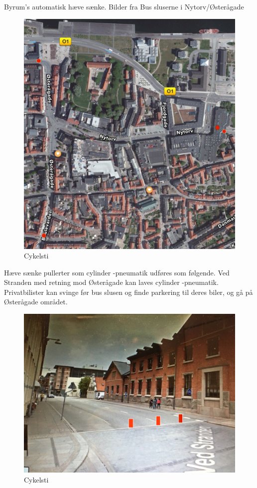           Byrum’s automatisk hæve sænke. Bilder fra %
Bus sluserne i Nytorv/Østerågade
\begin{figure}[htbp]
  \centering
  \begin{adjustbox}{max width=\textwidth}
    \includegraphics{figures/Billederogfigur/2.jpg}
 \end{adjustbox}
  \caption{Cykelsti}
   \label{fig:cykelsti}
\end{figure}
Hæve sænke pullerter som cylinder -pneumatik udføres som følgende. Ved Stranden med retning mod Østerågade kan laves cylinder -pneumatik. Privatbilister kan svinge før bus slusen og finde parkering til deres biler, og gå på Østerågade området.
\begin{figure}[htbp]
  \centering
  \begin{adjustbox}{max width=\textwidth}
    \includegraphics{figures/Billederogfigur/3.jpg}
 \end{adjustbox}
  \caption{Cykelsti}
   \label{fig:cykelsti}
\end{figure}
